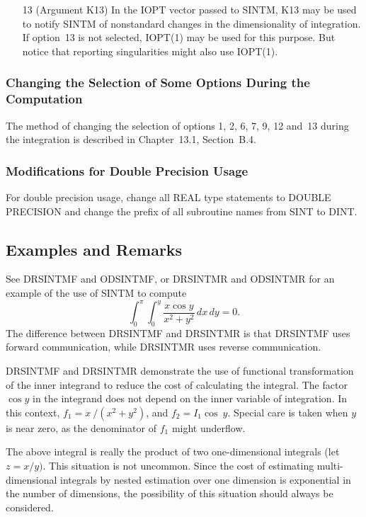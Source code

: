 \documentclass[twoside]{MATH77}
\begin{document}
\begin{itemize}
\item[13]  (Argument K13) In the IOPT vector passed to SINTM, K13 may be
used to notify SINTM of nonstandard changes in the dimensionality of
integration. If option~13 is not selected, IOPT(1) may be used for this
purpose. But notice that reporting singularities might also use IOPT(1).
\end{itemize}

\subsubsection{Changing the Selection of Some Options During the Computation
\label{ChangeSel}}

The method of changing the selection of options 1, 2, 6, 7, 9, 12 and~13
during the integration is described in Chapter~13.1, Section~B.4.

\subsubsection{Modifications for Double Precision Usage\label{DPuse}}

For double precision usage, change all REAL type statements to DOUBLE
PRECISION and change the prefix of all subroutine names from SINT to DINT.

\subsection{Examples and Remarks}

See DRSINTMF and ODSINTMF, or DRSINTMR and ODSINTMR for an example of the
use of SINTM to compute%
\begin{equation*}
\int_0^\pi \int_0^y\frac{x\cos y}{x^2+y^2}\,dx\,dy=0.
\end{equation*}
The difference between DRSINTMF and DRSINTMR is that DRSINTMF uses forward
communication, while DRSINTMR uses reverse communication.

DRSINTMF and DRSINTMR demonstrate the use of functional transformation of
the inner integrand to reduce the cost of calculating the integral. The
factor $\cos y$ in the integrand does not depend on the inner variable of
integration. In this context, $f_1 = x\ / (x^2 + y^2)$, and $f_2 = I_1 \cos
\ y$. Special care is taken when $y$ is near zero, as the denominator of
$f_1 $ might underflow.

The above integral is really the product of two one-dimensional integrals
(let $z = x/y)$. This situation is not uncommon. Since the cost of
estimating multi-dimensional integrals by nested estimation over one
dimension is exponential in the number of dimensions, the possibility of
this situation should always be considered.
\end{document}
